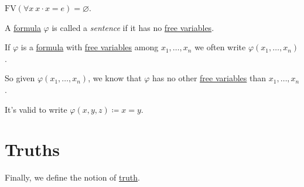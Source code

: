 \begin{eg}
	\(\mathrm{FV} (\forall x\ x\cdot x = e) = \varnothing \).
\end{eg}

\begin{definition}[Sentence]\label{def:sentence}
	A \hyperref[def:formula]{formula} \(\varphi \) is called a \emph{sentence} if it has no \hyperref[def:free-variable]{free variables}.
\end{definition}

\begin{notation}
	If \(\varphi \) is a \hyperref[def:formula]{formula} with \hyperref[def:free-variable]{free variables} among \(x_1, \dots , x_n\) we often write \(\varphi (x_1, \dots , x_n)\).
\end{notation}

\begin{remark}
	So given \(\varphi (x_1, \dots , x_n)\), we know that \(\varphi \) has no other \hyperref[def:free-variable]{free variables} than \(x_1, \dots , x_n\).
\end{remark}

\begin{eg}
	It's valid to write \(\varphi (x, y, z) \coloneqq x=y\).
\end{eg}

\section{Truths}
Finally, we define the notion of \hyperref[def:truth]{truth}.

